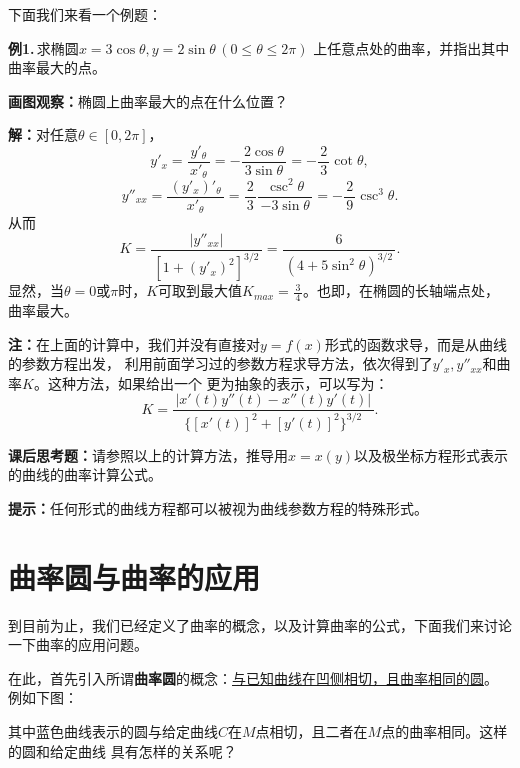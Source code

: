 \documentclass[a4paper]{article}
\newcommand*{\df}[2]{\displaystyle\frac{\,{#1}\,}{\,{#2}\,}}
\begin{document}
下面我们来看一个例题：

{\bf 例1.}\,求椭圆$x=3\cos \theta,y=2\sin \theta\,(0\leq \theta\leq 2\pi)$
上任意点处的曲率，并指出其中曲率最大的点。

{\bf 画图观察：}椭圆上曲率最大的点在什么位置？

{\bf 解：}对任意$\theta\in[0,2\pi]$，
$$y'_x=\df{y'_{\theta}}{x'_{\theta}}=-\df{2\cos\theta}{3\sin\theta}=-\df
23\cot\theta,$$ 
$$y''_{xx}=\df{(y'_x)'_{\theta}}{x'_{\theta}}
=\df23\df{\csc^2\theta}{-3\sin\theta}=-\df 29\csc^3\theta.$$
从而
$$K=\df{|y''_{xx}|}{[1+(y'_x)^2]^{3/2}}=\df 6{(4+5\sin^2\theta)^{3/2}}.$$
显然，当$\theta=0$或$\pi$时，$K$可取到最大值$K_{max}=\df 34$。也即，在椭圆的长轴端点处，
曲率最大。

{\bf 注：}在上面的计算中，我们并没有直接对$y=f(x)$形式的函数求导，而是从曲线的参数方程出发，
利用前面学习过的参数方程求导方法，依次得到了$y'_x,y''_{xx}$和曲率$K$。这种方法，如果给出一个
更为抽象的表示，可以写为：
$$K=\df{|x'(t)y''(t)-x''(t)y'(t)|}
		{\{[x'(t)]^2+[y'(t)]^2\}^{3/2}}.$$

{\bf 课后思考题：}请参照以上的计算方法，推导用$x=x(y)$以及极坐标方程形式表示
的曲线的曲率计算公式。

{\bf 提示：}任何形式的曲线方程都可以被视为曲线参数方程的特殊形式。

\section{曲率圆与曲率的应用}

到目前为止，我们已经定义了曲率的概念，以及计算曲率的公式，下面我们来讨论一下曲率的应用问题。

在此，首先引入所谓{\bf 曲率圆}的概念：\underline{与已知曲线在凹侧相切，且曲率相同的圆}。
例如下图：
\begin{center}
\end{center}
其中蓝色曲线表示的圆与给定曲线$C$在$M$点相切，且二者在$M$点的曲率相同。这样的圆和给定曲线
具有怎样的关系呢？
\end{document}
